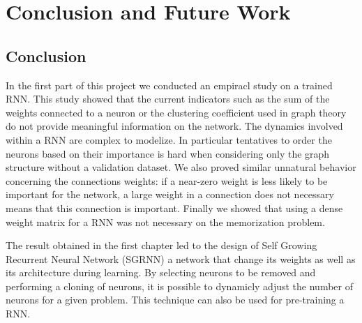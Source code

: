 
\chapter{Conclusion and Future Work} %

\label{Chapter 5} %




\section{Conclusion} 
    In the first part of this project we conducted an empiracl study on a trained RNN. This study showed that the current indicators such as the sum of the weights connected to a neuron or the clustering coefficient used in graph theory do not provide meaningful information on the network. The dynamics involved within a RNN are complex to modelize. In particular tentatives to order the neurons based on their importance is hard when considering only the graph structure without a validation dataset. We also proved similar unnatural behavior concerning the connections weights: if a near-zero weight is less likely to be important for the network, a large weight in a connection does not necessary means that this connection is important. Finally we showed that using a dense weight matrix for a RNN was not necessary on the memorization problem.  
 

    The result obtained in the first chapter led to the design of Self Growing Recurrent Neural Network (SGRNN) a network that change its weights as well as its architecture during learning. By selecting neurons to be removed and performing a cloning of neurons, it is possible to dynamicly adjust the number of neurons for a given problem. This technique can also be used for pre-training a RNN. 


